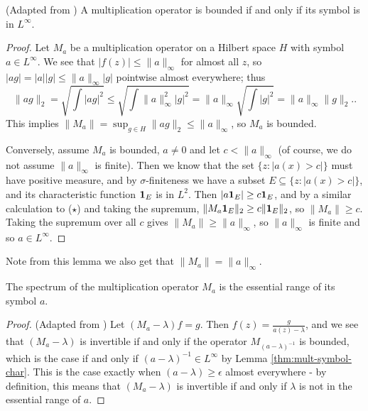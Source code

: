 \documentclass[../main.tex]{subfiles}
\begin{document}
\begin{lemma}\label{thm:mult-symbol-char}
(Adapted from \cite{arveson2002short})
A multiplication operator is bounded if and only if its symbol is in $L^\infty$.
\end{lemma}
\begin{proof}
Let $M_a$ be a multiplication operator on a Hilbert space $H$ with symbol $a \in L^\infty$. We see that $|f(z)| \leq \|a\|_\infty$ for almost all $z$, so $|a g| = |a||g| \leq \|a\|_\infty |g|$ pointwise almost everywhere; thus
\begin{equation*}
\|a g\|_2 = \sqrt{\int |a g|^2} \leq \sqrt{\int \|a\|_\infty^2|g|^2} = \|a\|_\infty \sqrt{\int |g|^2} = \|a\|_\infty \|g\|_2. .\tag{$\star$}
\end{equation*}
This implies $\|M_a\| = \sup_{g \in H} \|a g\|_2 \leq \|a\|_\infty$, so $M_a$ is bounded.

Conversely, assume $M_a$ is bounded, $a \neq 0$ and let $c < \|a\|_\infty$ (of course, we do not assume $\|a\|_\infty$ is finite). Then we know that the
set $\{z : |a(x) > c|\}$ must have positive measure, and by $\sigma$-finiteness we have a subset $E \subseteq \{z : |a(x) > c|\}$, and its characteristic 
function $\mathbf{1}_E$ is in $L^2$. Then $|a \mathbf{1}_E| \geq c \mathbf{1}_E$, and by a similar calculation to ($\star$) and taking the supremum, $\|M_a  \mathbf{1}_E\|_2 \geq c \|\mathbf{1}_E\|_2$, so $\|M_a\| \geq c$. Taking the supremum over all $c$ gives $\|M_a\| \geq \|a\|_\infty$, so $\|a\|_\infty$ is finite and so $a \in L^\infty$.
\end{proof}

Note from this lemma we also get that $\|M_a\| = \|a\|_\infty$.

\begin{theorem}\label{thm:mult-op-spec}
  The spectrum of the multiplication operator $M_a$ is the essential range of its symbol $a$.
\end{theorem}
\begin{proof}
(Adapted from \cite{garcia2023operator})
Let $(M_a - \lambda)f = g$. Then $f(z) = \frac{g}{a(z) - \lambda}$, and we see that $(M_a - \lambda)$ is invertible if and only if the operator
$M_{(a - \lambda)^{-1}}$ is bounded, which is the case if and only if $(a - \lambda)^{-1} \in L^\infty$ by Lemma \ref{thm:mult-symbol-char}.
This is the case exactly when $(a - \lambda) \geq \epsilon$ almost everywhere - by definition, this means that $(M_a - \lambda)$ is invertible if and
only if $\lambda$ is not in the essential range of $a$.
\end{proof}
\end{document}
